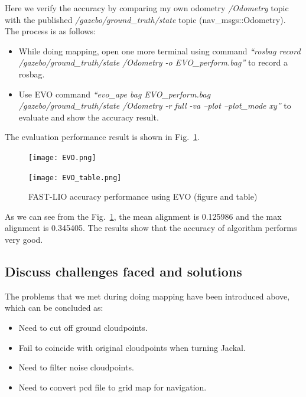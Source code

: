\documentclass[hyperref]{article}
\theoremstyle{nonumberplain}
\begin{document}
Here we verify the accuracy by comparing my own odometry \textit{/Odometry} topic with the published \textit{/gazebo/ground\_truth/state} topic (nav\_msgs::Odometry). The process is as follows:

\begin{itemize}[itemsep=3pt,topsep=0pt,parsep=0pt]
	\item While doing mapping, open one more terminal using command \textit{“rosbag record /gazebo/ground\_truth/state /Odometry -o EVO\_perform.bag”} to record a rosbag.
	\item Use EVO command \textit{“evo\_ape bag EVO\_perform.bag /gazebo/ground\_truth/state /Odometry -r full -va --plot --plot\_mode xy”} to evaluate and show the accuracy result.
\end{itemize}

The evaluation performance result is shown in Fig.~\ref{fig5}.

\begin{figure}[H]
	\centering
	\begin{minipage}[t]{0.45\textwidth}
		\centering
		\texttt{[image: EVO.png]}
	\end{minipage}
	\begin{minipage}[t]{0.45\textwidth}
		\centering
		\texttt{[image: EVO\_table.png]}
	\end{minipage}
	\caption{FAST-LIO accuracy performance using EVO (figure and table)}
	\label{fig5}
\end{figure} 

As we can see from the Fig.~\ref{fig5}, the mean alignment is 0.125986 and the max alignment is 0.345405. The results show that the accuracy of algorithm performs very good.

\subsection{Discuss challenges faced and solutions}
\hspace{1.0em}
The problems that we met during doing mapping have been introduced above, which can be concluded as: 

\begin{itemize}[itemsep=3pt,topsep=0pt,parsep=0pt]
	\item[1.] Need to cut off ground cloudpoints.
	\item[2.] Fail to coincide with original cloudpoints when turning Jackal.
	\item[3.] Need to filter noise cloudpoints.
	\item[4.] Need to convert pcd file to grid map for navigation.
\end{itemize}
\end{document}
